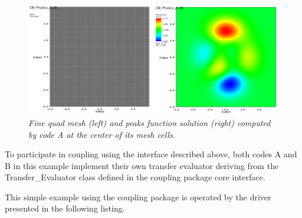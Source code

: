 \documentclass[letterpaper]{article}
\begin{document}
\begin{figure}[htpb!]
  \begin{center}
    \includegraphics[width=6in]{images/sol_A.png}
  \end{center}
  \caption{\small \sl Fine quad mesh (left) and peaks function
    solution (right) computed by code A at the center of its mesh
    cells.} 
  \label{fig:sol_A}
\end{figure}

To participate in coupling using the interface described above, both
codes A and B in this example implement their own transfer evaluator
deriving from the Transfer\_Evaluator class defined in the coupling
package core interface.

This simple example using the coupling package is operated by the
driver presented in the following listing.
\end{document}
